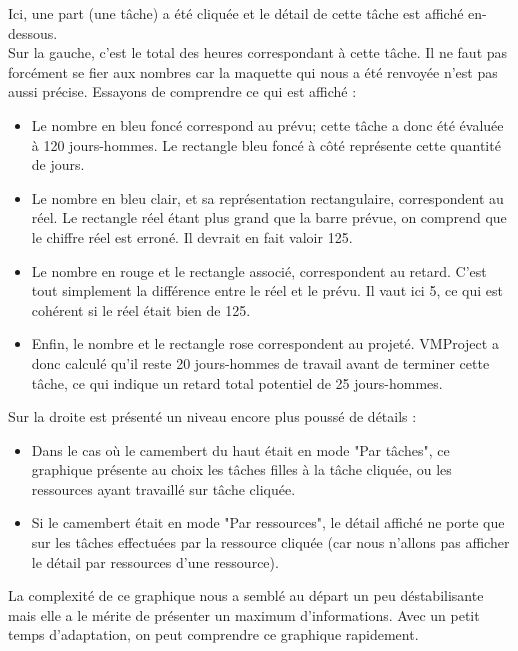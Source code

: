 \documentclass[12pt]{report}
\begin{document}
\begin{appendices}
Ici, une part (une tâche) a été cliquée et le détail de cette tâche est affiché en-dessous.\\

Sur la gauche, c'est le total des heures correspondant à cette tâche. Il ne faut pas forcément se fier aux nombres car la maquette qui nous a été renvoyée n'est pas aussi précise. Essayons de comprendre ce qui est affiché :\\

\begin{itemize}
\item Le nombre en bleu foncé correspond au prévu; cette tâche a donc été évaluée à 120 jours-hommes. Le rectangle bleu foncé à côté représente cette quantité de jours.
\item Le nombre en bleu clair, et sa représentation rectangulaire, correspondent au réel. Le rectangle réel étant plus grand que la barre prévue, on comprend que le chiffre réel est erroné. Il devrait en fait valoir 125.
\item Le nombre en rouge et le rectangle associé, correspondent au retard. C'est tout simplement la différence entre le réel et le prévu. Il vaut ici 5, ce qui est cohérent si le réel était bien de 125.
\item Enfin, le nombre et le rectangle rose correspondent au projeté. VMProject a donc calculé qu'il reste 20 jours-hommes de travail avant de terminer cette tâche, ce qui indique un retard total potentiel de 25 jours-hommes.\\
\end{itemize}

Sur la droite est présenté un niveau encore plus poussé de détails :\\

\begin{itemize}
\item Dans le cas où le camembert du haut était en mode "Par tâches", ce graphique présente au choix les tâches filles à la tâche cliquée, ou les ressources ayant travaillé sur tâche cliquée.
\item Si le camembert était en mode "Par ressources", le détail affiché ne porte que sur les tâches effectuées par la ressource cliquée (car nous n'allons pas afficher le détail par ressources d'une ressource).\\
\end{itemize}

La complexité de ce graphique nous a semblé au départ un peu déstabilisante mais elle a le mérite de présenter un maximum d'informations. Avec un petit temps d'adaptation, on peut comprendre ce graphique rapidement.\\


\end{appendices}
\end{document}
